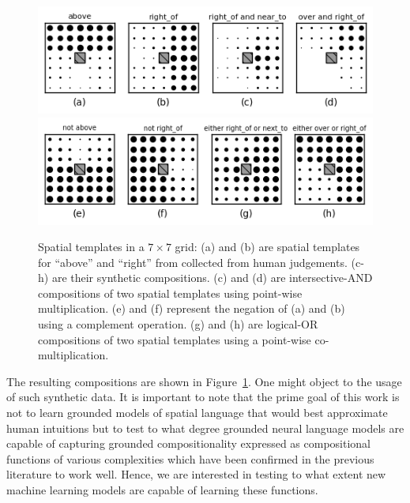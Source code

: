 \begin{figure}[hbt]
\centering
\includegraphics[scale=0.85]{studies/iwcs2017/images/compositions_abcd.png}
\includegraphics[scale=0.85]{studies/iwcs2017/images/compositions_efgh.png}
\caption{\label{iwcs2017:fig:composition}
Spatial templates in a $7 \times 7$ grid:
(a) and (b) are spatial templates for ``above'' and ``right'' from
\cite{logan1996computational} collected from human judgements. (c-h) are
their synthetic compositions. (c) and (d) are
intersective-AND compositions of two spatial templates using point-wise 
multiplication. (e) and (f) represent the negation of (a) and (b) using a
complement operation. (g) and (h) are logical-OR compositions of two spatial templates
using a point-wise co-multiplication.}
\end{figure}
The resulting compositions are shown in Figure~\ref{iwcs2017:fig:composition}. One might object to the usage of such synthetic data. It is important to note
that the prime goal of this work is not to learn grounded models of spatial
language that would best approximate human intuitions but to test to what degree
grounded neural language models are capable of capturing grounded
compositionality expressed as compositional functions of various complexities which have been confirmed in the previous literature to work well. Hence, we are interested in
testing to what extent new machine learning models are capable of learning these functions.

